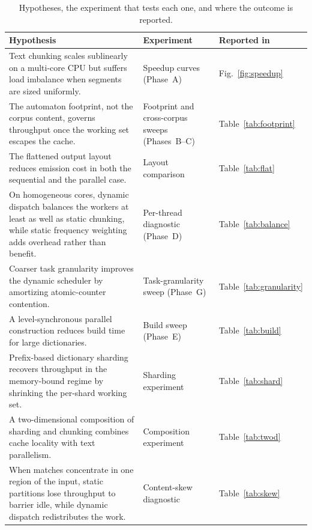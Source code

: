 \begin{table}[htbp]
    \centering
    \caption{Hypotheses, the experiment that tests each one, and where the outcome is reported.}
    \label{tab:hypotheses}
    \small
    \begin{tabular}{@{}
        >{\raggedright\arraybackslash}p{8.8cm}
        >{\raggedright\arraybackslash}p{3.4cm}
        >{\raggedright\arraybackslash}p{2.6cm}
    @{}}
        \toprule
        \textbf{Hypothesis} & \textbf{Experiment} & \textbf{Reported in} \\
        \midrule
        Text chunking scales sublinearly on a multi-core CPU but suffers load imbalance when segments are sized uniformly. & Speedup curves (Phase~A) & Fig.~\ref{fig:speedup} \\ \addlinespace
        The automaton footprint, not the corpus content, governs throughput once the working set escapes the cache. & Footprint and cross-corpus sweeps (Phases~B--C) & Table~\ref{tab:footprint} \\ \addlinespace
        The flattened output layout reduces emission cost in both the sequential and the parallel case. & Layout comparison & Table~\ref{tab:flat} \\ \addlinespace
        On homogeneous cores, dynamic dispatch balances the workers at least as well as static chunking, while static frequency weighting adds overhead rather than benefit. & Per-thread diagnostic (Phase~D) & Table~\ref{tab:balance} \\ \addlinespace
        Coarser task granularity improves the dynamic scheduler by amortizing atomic-counter contention. & Task-granularity sweep (Phase~G) & Table~\ref{tab:granularity} \\ \addlinespace
        A level-synchronous parallel construction reduces build time for large dictionaries. & Build sweep (Phase~E) & Table~\ref{tab:build} \\ \addlinespace
        Prefix-based dictionary sharding recovers throughput in the memory-bound regime by shrinking the per-shard working set. & Sharding experiment & Table~\ref{tab:shard} \\ \addlinespace
        A two-dimensional composition of sharding and chunking combines cache locality with text parallelism. & Composition experiment & Table~\ref{tab:twod} \\ \addlinespace
        When matches concentrate in one region of the input, static partitions lose throughput to barrier idle, while dynamic dispatch redistributes the work. & Content-skew diagnostic & Table~\ref{tab:skew} \\
        \bottomrule
    \end{tabular}

\end{table}

